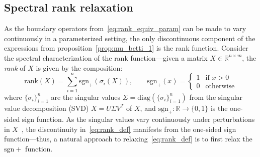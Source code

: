 \documentclass[10pt]{article}
\numberwithin{equation}{section}
\newcommand{\+}{%
	\raisebox{0.18ex}{\scaleobj{0.55}{+}}
}
\theoremstyle{definition}
\theoremstyle{definition}
\begin{document}
\subsection{Spectral rank relaxation}\label{sec:spectral_relax}
As the boundary operators from~\eqref{eq:rank_equiv_param} can be made to vary continuously in a parameterized setting, the only discontinuous component of the expressions from proposition~\ref{prop:mu_betti_1} is the rank function. Consider the spectral characterization of the rank function---given a matrix $X \in \mathbb{R}^{n \times m}$, the \emph{rank} of $X$ is given by the composition:
\begin{equation}\label{eq:rank_def}
	\mathrm{rank}(X) = \sum\limits_{i=1}^{n} \mathrm{sgn}_+(\sigma_i(X)), \quad \quad \mathrm{sgn}_{+}(x) = \begin{cases}
		1 & \text{if } x > 0 \\
		0 & \text{otherwise}
	\end{cases}
\end{equation}
where $\{\sigma_i \}_{i=1}^n$ are the singular values $\Sigma = \mathrm{diag}(\{\sigma_i \}_{i=1}^n)$ from the singular value decomposition (SVD) $X = U \Sigma V^T$ of $X$, and $\mathrm{sgn}_+: \mathbb{R} \to \{0, 1\}$ is the one-sided sign function. 
 As the singular values vary continuously under perturbations in $X$~\cite{bhatia2013matrix}, the discontinuity in~\eqref{eq:rank_def} manifests from the one-sided sign function---thus, a natural approach to relaxing~\eqref{eq:rank_def} is to first relax the $\mathrm{sgn}+$ function.
\end{document}

